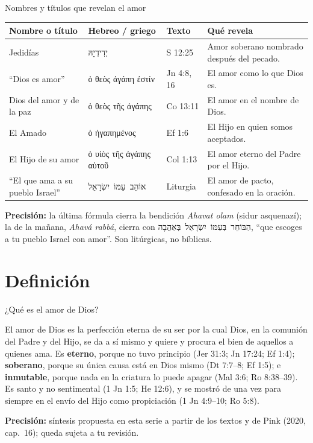 \documentclass[hyperref={bookmarks=false},aspectratio=169]{beamer}
\newcommand{\heb}[1]{\mbox{\foreignlanguage{hebrew}{#1}}}
\newcommand{\grc}[1]{\foreignlanguage{ancientgreek}{#1}}
\newcommand{\destacar}[1]{\textbf{\textcolor{azul}{#1}}}
\newcommand{\precision}[1]{{\footnotesize\color{gris}\textbf{Precisión:} #1}}
\begin{document}
\begin{frame}{Nombres y títulos que revelan el amor}
\scriptsize\renewcommand{\arraystretch}{1.15}
\begin{tabular}{@{}>{\RaggedRight\arraybackslash}p{2.8cm}>{\RaggedRight\arraybackslash}p{3.3cm}>{\RaggedRight\arraybackslash}p{1.8cm}>{\RaggedRight\arraybackslash}p{4.0cm}@{}}
\toprule
\textbf{Nombre o título} & \textbf{Hebreo / griego} & \textbf{Texto} & \textbf{Qué revela} \\ \midrule
Jedidías & \heb{יְדִידְיָהּ} & 2 S 12:25 & Amor soberano nombrado después del pecado. \\
``Dios es amor'' & \grc{ὁ θεὸς ἀγάπη ἐστίν} & 1 Jn 4:8, 16 & El amor como lo que Dios es. \\
Dios del amor y de la paz & \grc{ὁ θεὸς τῆς ἀγάπης} & 2 Co 13:11 & El amor en el nombre de Dios. \\
El Amado & \grc{ὁ ἠγαπημένος} & Ef 1:6 & El Hijo en quien somos aceptados. \\
El Hijo de su amor & \grc{ὁ υἱὸς τῆς ἀγάπης αὐτοῦ} & Col 1:13 & El amor eterno del Padre por el Hijo. \\
``El que ama a su pueblo Israel'' & \heb{אוֹהֵב עַמּוֹ יִשְׂרָאֵל} & Liturgia & El amor de pacto, confesado en la oración. \\
\bottomrule
\end{tabular}\par\smallskip
\precision{la última fórmula cierra la bendición \emph{Ahavat olam} (sidur asquenazí); la de la mañana, \emph{Ahavá rabbá}, cierra con \heb{הַבּוֹחֵר בְּעַמּוֹ יִשְׂרָאֵל בְּאַהֲבָה}, ``que escoges a tu pueblo Israel con amor''. Son litúrgicas, no bíblicas.}
\end{frame}

\section{Definición}

\begin{frame}{¿Qué es el amor de Dios?}
\begin{tcolorbox}[colback=papiro,colframe=azul,boxrule=1pt,arc=3pt]
\small El amor de Dios es la perfección eterna de su ser por la cual Dios, en la comunión del Padre y del Hijo, se da a sí mismo y quiere y procura el bien de aquellos a quienes ama. Es \destacar{eterno}, porque no tuvo principio (Jer 31:3; Jn 17:24; Ef 1:4); \destacar{soberano}, porque su única causa está en Dios mismo (Dt 7:7--8; Ef 1:5); e \destacar{inmutable}, porque nada en la criatura lo puede apagar (Mal 3:6; Ro 8:38--39). Es santo y no sentimental (1 Jn 1:5; He 12:6), y se mostró de una vez para siempre en el envío del Hijo como propiciación (1 Jn 4:9--10; Ro 5:8).
\end{tcolorbox}
\precision{síntesis propuesta en esta serie a partir de los textos y de Pink (2020, cap.~16); queda sujeta a tu revisión.}
\end{frame}
\end{document}
